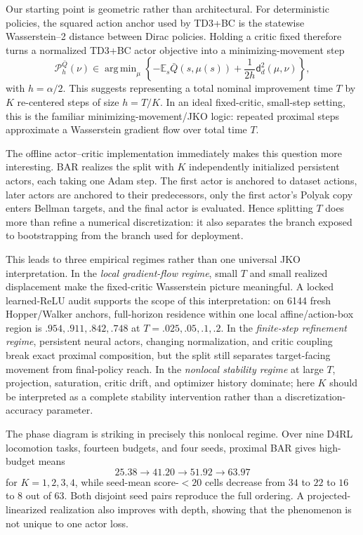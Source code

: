 \documentclass[twoside]{article}
\newcommand{\E}{\mathbb E}
\DeclareMathOperator*{\argmin}{arg\,min}
\begin{document}
Our starting point is geometric rather than architectural. For deterministic policies, the squared action anchor used by TD3+BC is the statewise Wasserstein--2 distance between Dirac policies. Holding a critic fixed therefore turns a normalized TD3+BC actor objective into a minimizing-movement step
\begin{equation}
\mathcal P_h^{\bar Q}(\nu)\in\argmin_\mu\left\{-\E_s\bar Q(s,\mu(s))+\frac{1}{2h}\mathsf d_d^2(\mu,\nu)\right\},
\label{eq:intro_prox}
\end{equation}
with $h=\alpha/2$. This suggests representing a total nominal improvement time $T$ by $K$ re-centered steps of size $h=T/K$. In an ideal fixed-critic, small-step setting, this is the familiar minimizing-movement/JKO logic: repeated proximal steps approximate a Wasserstein gradient flow over total time $T$.

The offline actor--critic implementation immediately makes this question more interesting. BAR realizes the split with $K$ independently initialized persistent actors, each taking one Adam step. The first actor is anchored to dataset actions, later actors are anchored to their predecessors, only the first actor's Polyak copy enters Bellman targets, and the final actor is evaluated. Hence splitting $T$ does more than refine a numerical discretization: it also separates the branch exposed to bootstrapping from the branch used for deployment.

This leads to three empirical regimes rather than one universal JKO interpretation. In the \emph{local gradient-flow regime}, small $T$ and small realized displacement make the fixed-critic Wasserstein picture meaningful. A locked learned-ReLU audit supports the scope of this interpretation: on 6144 fresh Hopper/Walker anchors, full-horizon residence within one local affine/action-box region is $.954,.911,.842,.748$ at $T=.025,.05,.1,.2$. In the \emph{finite-step refinement regime}, persistent neural actors, changing normalization, and critic coupling break exact proximal composition, but the split still separates target-facing movement from final-policy reach. In the \emph{nonlocal stability regime} at large $T$, projection, saturation, critic drift, and optimizer history dominate; here $K$ should be interpreted as a complete stability intervention rather than a discretization-accuracy parameter.

The phase diagram is striking in precisely this nonlocal regime. Over nine D4RL locomotion tasks, fourteen budgets, and four seeds, proximal BAR gives high-budget means
\[
25.38\rightarrow41.20\rightarrow51.92\rightarrow63.97
\]
for $K=1,2,3,4$, while seed-mean score-$<20$ cells decrease from $34$ to $22$ to $16$ to $8$ out of $63$. Both disjoint seed pairs reproduce the full ordering. A projected-linearized realization also improves with depth, showing that the phenomenon is not unique to one actor loss.
\end{document}

